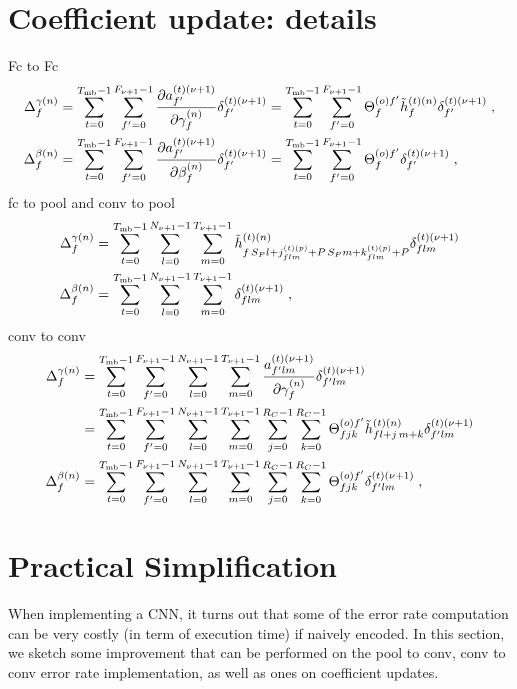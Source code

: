 \begin{subappendices}
\section{Coefficient update: details}
Fc to Fc
\begin{align}
\Delta_f^{\gamma(n)}&=\sum_{t=0}^{T_{{\rm mb}}-1}\sum_{f'=0}^{F_{\nu+1}-1}
%
\frac{\partial a^{(t)(\nu+1)}_{f'}}{\partial\gamma_f^{(n)}}\delta^{(t)(\nu+1)}_{f'}
%
=\sum_{t=0}^{T_{{\rm mb}}-1}\sum_{f'=0}^{F_{\nu+1}-1}
%
\Theta^{(o)f'}_{f}\tilde{h}^{(t)(n)}_{f}\delta^{(t)({\nu+1})}_{f'}\;,\\
%
\Delta_f^{\beta(n)}&=\sum_{t=0}^{T_{{\rm mb}}-1}\sum_{f'=0}^{F_{\nu+1}-1}
%
\frac{\partial a^{(t)(\nu+1)}_{f'}}{\partial\beta_f^{(n)}}\delta^{(t)(\nu+1)}_{f'}
%
=\sum_{t=0}^{T_{{\rm mb}}-1}\sum_{f'=0}^{F_{\nu+1}-1}\Theta^{(o)f'}_{f}\delta^{(t)(\nu+1)}_{f'}\;,
\end{align}
fc to pool and conv to pool
\begin{align}
\Delta_f^{\gamma(n)}&=
%
\sum_{t=0}^{T_{{\rm mb}}-1}\sum_{l=0}^{N_{\nu+1}-1}\sum_{m=0}^{T_{\nu+1}-1}
%
\tilde{h}_{f\,S_P l+j_{flm}^{(t)(p)}+P\,S_Pm+k_{flm}^{(t)(p)}+P}^{(t)(n)}\delta^{(t)(\nu+1)}_{flm}\\
%
\Delta_f^{\beta(n)}&=
%
\sum_{t=0}^{T_{{\rm mb}}-1}\sum_{l=0}^{N_{\nu+1}-1}\sum_{m=0}^{T_{\nu+1}-1}\delta^{(t)(\nu+1)}_{flm}\;,
\end{align}
conv to conv
\begin{align}
\Delta_f^{\gamma(n)}&=
%
\sum_{t=0}^{T_{{\rm mb}}-1}\sum_{f'=0}^{F_{\nu+1}-1}\sum_{l=0}^{N_{\nu+1}-1}\sum_{m=0}^{T_{\nu+1}-1}
%
\frac{a^{(t)(\nu+1)}_{f'lm}}{\partial \gamma_f^{(n)}}\delta^{(t)(\nu+1)}_{f'lm}\\
%
&=\sum_{t=0}^{T_{{\rm mb}}-1}\sum_{f'=0}^{F_{\nu+1}-1}\sum_{l=0}^{N_{\nu+1}-1}\sum_{m=0}^{T_{\nu+1}-1}
%
\sum_{j=0}^{R_C-1}\sum_{k=0}^{R_C-1}\Theta^{(o)f'}_{fjk}
%
\tilde{h}^{(t)(n)}_{fl+j\,m+k}\delta^{(t)(\nu+1)}_{f'lm}\\
%
\Delta_f^{\beta(n)}&=
%
\sum_{t=0}^{T_{{\rm mb}}-1}\sum_{f'=0}^{F_{\nu+1}-1}\sum_{l=0}^{N_{\nu+1}-1}\sum_{m=0}^{T_{\nu+1}-1}
%
\sum_{j=0}^{R_C-1}\sum_{k=0}^{R_C-1}\Theta^{(o)f'}_{fjk}\delta^{(t)(\nu+1)}_{f'lm}\;,
\end{align}

\section{Practical Simplification} \label{sec:pracsimpl}

When implementing a CNN, it turns out that some of the error rate computation can be very costly (in term of execution time) if naively encoded. In this section, we sketch some improvement that can be performed on the pool to conv, conv to conv error rate implementation, as well as ones on coefficient updates.


\end{subappendices}

